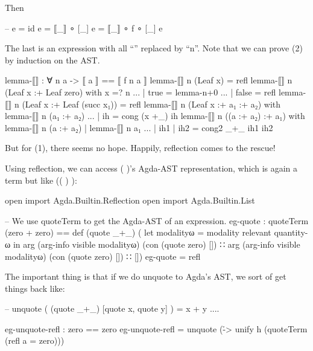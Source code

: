 \documentclass{article}
\begin{document}
Then

\begin{code}
-- e = id e = ⟦_⟧ ∘ [_] e = ⟦_⟧ ∘ f ∘ [_] e
\end{code}

The last is an expression with all ``'' replaced by ``n''. Note that we can prove (2) by induction on the AST.

\begin{code}
lemma-⟦⟧ : ∀ n a ->  ⟦ a ⟧ == ⟦ f n a ⟧
lemma-⟦⟧ n (Leaf x) = refl
lemma-⟦⟧ n (Leaf x :+ Leaf zero) with x =? n
... | true = lemma-n+0
... | false = refl
lemma-⟦⟧ n (Leaf x :+ Leaf (succ x₁)) = refl
lemma-⟦⟧ n (Leaf x :+ a₁ :+ a₂) with lemma-⟦⟧ n (a₁ :+ a₂)
... | ih = cong (x +_) ih
lemma-⟦⟧ n ((a :+ a₂) :+ a₁) with lemma-⟦⟧ n (a :+ a₂) | lemma-⟦⟧ n a₁
... | ih1 | ih2 = cong2 _+_ ih1 ih2
\end{code}

But for (1), there seems no hope. Happily, reflection comes to the rescue!

Using reflection, we can access \AgdaSymbol( \AgdaOperator{\AgdaFunction{+}} \AgdaSymbol)'s Agda-AST representation, which is again a term but like \AgdaSymbol(\AgdaSymbol( \AgdaFunction{\AgdaUnderscore{}+\AgdaUnderscore{}}\AgdaSymbol) \AgdaOperator{\AgdaFunction{[}}   \AgdaOperator{\AgdaInductiveConstructor{,}}   \AgdaOperator{\AgdaFunction{]}}\AgdaSymbol):

\begin{code}
open import Agda.Builtin.Reflection
open import Agda.Builtin.List

-- We use quoteTerm to get the Agda-AST of an expression.
eg-quote : quoteTerm (zero + zero) ==
  def (quote _+_)
      ( let modalityω = modality relevant quantity-ω in
        arg (arg-info visible modalityω) (con (quote zero) [])
      ∷ arg (arg-info visible modalityω) (con (quote zero) [])
      ∷ [])
eg-quote = refl
\end{code}

The important thing is that if we do unquote to Agda's AST, we sort of get things back like:

\begin{code}
-- unquote ( (quote _+_) [quote x, quote y] ) = x + y ....
\end{code}

\begin{code}
eg-unquote-refl : zero == zero
eg-unquote-refl = unquote (\h -> unify h (quoteTerm (refl {a = zero})))
\end{code}
\end{document}
